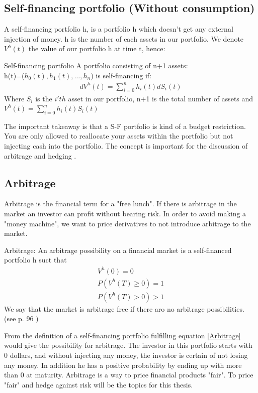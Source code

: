 \subsection{Self-financing portfolio (Without consumption)}
A self-financing portfolio h, is a portfolio h which doesn't get any external injection of money. h is the number of each assets in our portfolio. We denote $V^{h}(t)$ the value of our portfolio h at time t, hence:
\theoremstyle{definition}
\begin{definition}{Self-financing portfolio}
A portfolio consisting of n+1 assets: \\
h(t)=($h_0(t),h_1(t), \dotsc, h_{n}$) is self-financing if:
\begin{equation}\label{SF}
\begin{split}
dV^{h}(t)=\sum_{i=0}^{n} h_{i}(t) dS_{i}(t)
\end{split}
\end{equation}
Where $S_{i}$ is the $i'th$ asset in our portfolio, n+1 is the total number of assets and\\
$V^{h}(t)=\sum_{i=0}^{n} h_{i}(t) S_{i}(t)$
\end{definition}
The important takeaway is that a S-F portfolio is kind of a budget restriction. You are only allowed to reallocate your assets within the portfolio but not injecting cash into the portfolio. The concept is important for the discussion of arbitrage and hedging \parencite{finKont}.

\subsection{Arbitrage}
Arbitrage is the financial term for a "free lunch". If there is arbitrage in the market an investor can profit without bearing risk. In order to avoid making a "money machine", we want to price derivatives to not introduce arbitrage to the market.  
\theoremstyle{definition}
\begin{definition}{Arbitrage:}
An arbitrage possibility on a financial market is a self-financed portfolio h suct that
\begin{equation}\label{Arbitrage}
\begin{split}
V^{h}(0)=0\\
P(V^{h}(T)\geq 0)=1\\
P(V^{h}(T)>0)>1
\end{split}
\end{equation}
We say that the market is arbitrage free if there aro no arbitrage possibilities.\\
(see p. 96 \parencite{finKont})
\end{definition}
From the definition of a self-financing portfolio fulfilling equation \eqref{Arbitrage} would give the possibility for arbitrage. The investor in this portfolio starts with 0 dollars, and without injecting any money, the investor is certain of not losing any money. In addition he has a positive probability by ending up with more than 0 at maturity. Arbitrage is a way to price financial products "fair". To price "fair" and hedge against risk will be the topics for this thesis.

